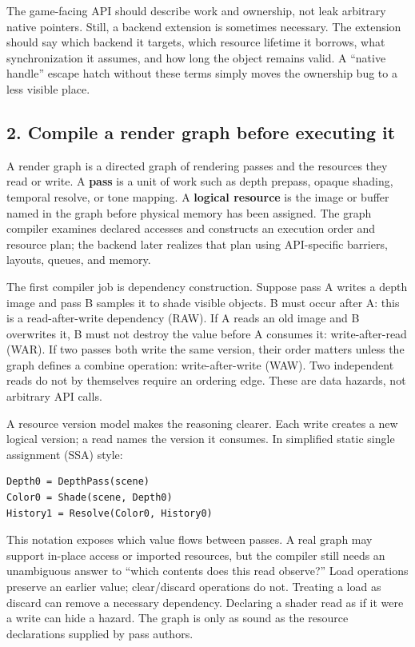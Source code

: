 The game-facing API should describe work and ownership, not leak arbitrary native pointers. Still, a backend extension is sometimes necessary. The extension should say which backend it targets, which resource lifetime it borrows, what synchronization it assumes, and how long the object remains valid. A ``native handle'' escape hatch without these terms simply moves the ownership bug to a less visible place.

\subsection{2. Compile a render graph before executing it}\label{compile-a-render-graph-before-executing-it}

A render graph is a directed graph of rendering passes and the resources they read or write. A \textbf{pass} is a unit of work such as depth prepass, opaque shading, temporal resolve, or tone mapping. A \textbf{logical resource} is the image or buffer named in the graph before physical memory has been assigned. The graph compiler examines declared accesses and constructs an execution order and resource plan; the backend later realizes that plan using API-specific barriers, layouts, queues, and memory.

The first compiler job is dependency construction. Suppose pass A writes a depth image and pass B samples it to shade visible objects. B must occur after A: this is a read-after-write dependency (RAW). If A reads an old image and B overwrites it, B must not destroy the value before A consumes it: write-after-read (WAR). If two passes both write the same version, their order matters unless the graph defines a combine operation: write-after-write (WAW). Two independent reads do not by themselves require an ordering edge. These are data hazards, not arbitrary API calls.

A resource version model makes the reasoning clearer. Each write creates a new logical version; a read names the version it consumes. In simplified static single assignment (SSA) style:

\begin{verbatim}
Depth0 = DepthPass(scene)
Color0 = Shade(scene, Depth0)
History1 = Resolve(Color0, History0)
\end{verbatim}

This notation exposes which value flows between passes. A real graph may support in-place access or imported resources, but the compiler still needs an unambiguous answer to ``which contents does this read observe?'' Load operations preserve an earlier value; clear/discard operations do not. Treating a load as discard can remove a necessary dependency. Declaring a shader read as if it were a write can hide a hazard. The graph is only as sound as the resource declarations supplied by pass authors.

